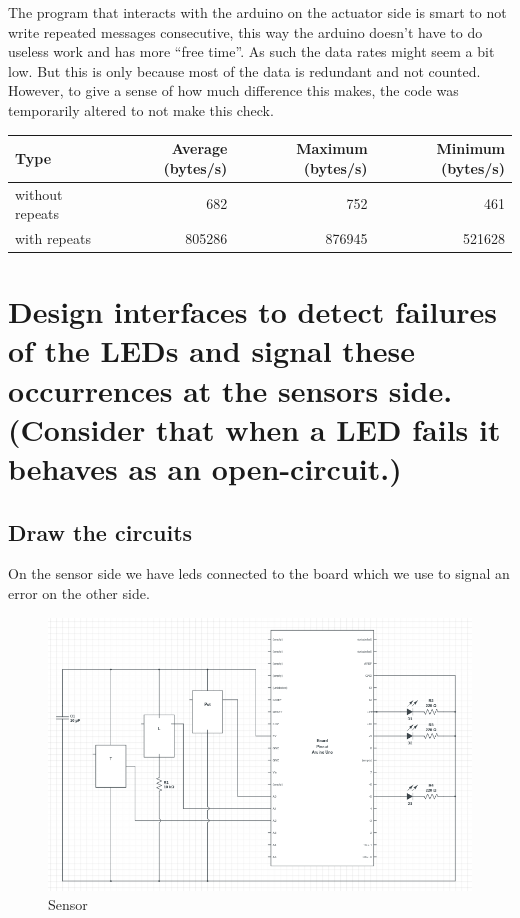 \documentclass[10pt]{article}
\begin{document}
The program that interacts with the arduino on the actuator side is smart to not
write repeated messages consecutive, this way the arduino doesn't have to do
useless work and has more ``free time''. As such the data rates might seem a bit
low. But this is only because most of the data is redundant and not counted.
However, to give a sense of how much difference this makes, the code was
temporarily altered to not make this check.

\begin{tabular}{lrrr}
    Type            & Average (bytes/s) & Maximum (bytes/s) & Minimum (bytes/s) \\
    \toprule
    without repeats & 682               & 752               & 461 \\
    with repeats    & 805286            & 876945            & 521628 \\
    \bottomrule
\end{tabular}

\section{Design interfaces to detect failures of the LEDs and signal these
occurrences at the sensors side. (Consider that when a LED fails it behaves as an
open-circuit.)}

\subsection{Draw the circuits}

On the sensor side we have leds connected to the board which we use to signal an
error on the other side.

\begin{figure}[H]
    \centering
    \includegraphics[width=\textwidth]{sensor2.png}
    \caption{Sensor}
\end{figure}
\end{document}

